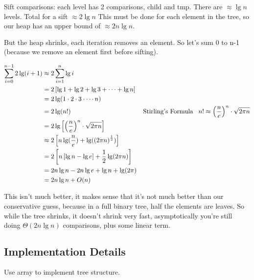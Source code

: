 \documentclass[english, 10pt]{article}
\begin{document}
Sift comparisons: each level has 2 comparisons, child and tmp. There are
$\approx \lg n $ levels. Total for a sift $\approx 2 \lg n$ This must be done
for each element in the tree, so our heap has an upper bound of $\approx 2n \lg
n$.

But the heap shrinks, each iteration removes an element. So let's sum 0 to n-1
(because we remove an element first before sifting).

\begin{align*}
\sum_{i=0}^{n-1}2 \lg (i+1) &\approx 2\sum_{i=1}^{n}\lg i \\
&=2\left[ \lg 1 + \lg 2 + \lg 3 + \cdots + \lg n \right]\\
&=2 \lg( 1\cdot2\cdot3\cdot\cdots n) \\
&=2 \lg(n!) &\text{Stirling's Formula}\;\;\; n! \approx {\left( \frac{n}{e} \right)}^n \cdot \sqrt{2\pi n} \\
&=2\lg\left[{\left( \frac{n}{e} \right)}^n \cdot \sqrt{2\pi n} \right] \\
&\approx 2\left[ n \lg(\frac{n}{e})+\lg({(2\pi n)}^{\frac{1}{2}}) \right] \\
&= 2\left[ n\left[ \lg n - \lg e \right]+ \frac{1}{2}\lg(2\pi n) \right] \\
&=2n\lg n -2n\lg e + \lg n + \lg(2\pi) \\
&=2n\lg n + O(n)
\end{align*}

This isn't much better, it makes sense that it's not much better than our
conservative guess, because in a full binary tree, half the elements are
leaves. So while the tree shrinks, it doesn't shrink very fast, asymptotically
you're still doing $\Theta(2n\lg n)$ comparisons, plus some linear term.

\subsection{Implementation Details}
Use array to implement tree structure.

\end{document}
